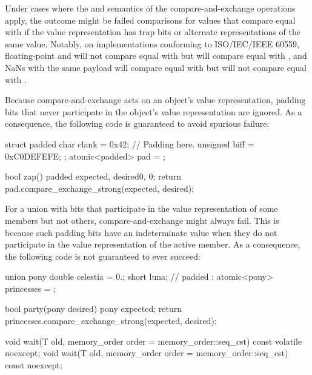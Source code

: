 \begin{itemdescr}
\pnum
\begin{note}
Under cases where the  and  semantics of the compare-and-exchange
operations apply, the outcome might be failed comparisons for values that compare equal with
 if the value representation has trap bits or alternate
representations of the same value. Notably, on implementations conforming to
ISO/IEC/IEEE 60559, floating-point  and 
will not compare equal with  but will compare equal with ,
and NaNs with the same payload will compare equal with  but will not
compare equal with .
\end{note}
\begin{note}
Because compare-and-exchange acts on an object's value representation,
padding bits that never participate in the object's value representation
are ignored. As a consequence, the following code is guaranteed to avoid
spurious failure:
\begin{codeblock}
struct padded {
  char clank = 0x42;
  // Padding here.
  unsigned biff = 0xC0DEFEFE;
};
atomic<padded> pad = {};

bool zap() {
  padded expected, desired{0, 0};
  return pad.compare_exchange_strong(expected, desired);
}
\end{codeblock}
\end{note}
\begin{note}
For a union with bits that participate in the value representation
of some members but not others, compare-and-exchange might always fail.
This is because such padding bits have an indeterminate value when they
do not participate in the value representation of the active member.
As a consequence, the following code is not guaranteed to ever succeed:
\begin{codeblock}
union pony {
  double celestia = 0.;
  short luna;       // padded
};
atomic<pony> princesses = {};

bool party(pony desired) {
  pony expected;
  return princesses.compare_exchange_strong(expected, desired);
}
\end{codeblock}
\end{note}
\end{itemdescr}

%
%
%
%
\begin{itemdecl}
void wait(T old, memory_order order = memory_order::seq_cst) const volatile noexcept;
void wait(T old, memory_order order = memory_order::seq_cst) const noexcept;
\end{itemdecl}

